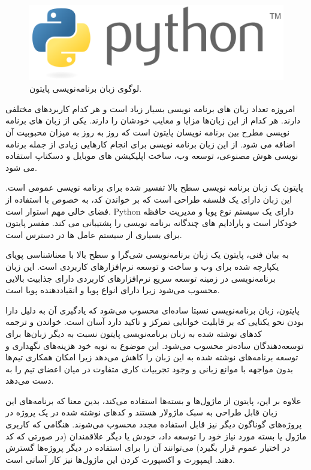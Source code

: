\begin{figure}[!h]
	\centering
	\includegraphics[width=0.7\linewidth]{Assets/python.png}
	\caption{لوگوی زبان برنامه‌نویسی پایتون.}
	\label{fig:pythonlogo}
\end{figure}

امروزه تعداد زبان های برنامه نویسی بسیار زیاد است و هر کدام کاربردهای مختلفی دارند. هر کدام از این زبان‌ها مزایا و معایب خودشان را دارند. یکی از زبان‌ های برنامه نویسی مطرح بین برنامه نویسان پایتون است که روز به روز به میزان محبوبیت آن اضافه می شود. از این زبان برنامه نویسی برای انجام کارهایی زیادی از جمله برنامه نویسی هوش مصنوعی، توسعه وب، ساخت اپلیکیشن های موبایل و دسکتاپ استفاده می شود.

پایتون یک زبان برنامه نویسی سطح بالا تفسیر شده برای برنامه نویسی عمومی است. این زبان دارای یک فلسفه طراحی است که بر خواندن کد، به خصوص با استفاده از فضای خالی مهم استوار است. Python دارای یک سیستم نوع پویا و مدیریت حافظه خودکار است و پارادایم های چندگانه برنامه نویسی را پشتیبانی می کند. مفسر پایتون برای بسیاری از سیستم عامل ها در دسترس است.

به بیان فنی، پایتون یک زبان برنامه‌نویسی شی‌گرا و سطح بالا  با معناشناسی پویای یکپارچه شده برای وب و ساخت و توسعه نرم‌افزارهای کاربردی است. این زبان برنامه‌نویسی در زمینه توسعه سریع نرم‌افزارهای کاربردی دارای جذابیت بالایی محسوب می‌شود زیرا دارای انواع پویا و انقیاددهنده پویا است.

پایتون، زبان برنامه‌نویسی نسبتا ساده‌ای محسوب می‌شود که یادگیری آن به دلیل دارا بودن نحو یکتایی که بر قابلیت خوانایی تمرکز و تاکید دارد آسان است. خواندن و ترجمه کدهای نوشته شده به زبان برنامه‌نویسی پایتون نسبت به دیگر زبان‌ها برای توسعه‌دهندگان ساده‌تر محسوب می‌شود. این موضوع به نوبه خود هزینه‌های نگهداری و توسعه برنامه‌های نوشته شده به این زبان را کاهش می‌دهد زیرا امکان همکاری تیم‌ها بدون مواجهه با موانع زبانی و وجود تجربیات کاری متفاوت در میان اعضای تیم را به دست می‌دهد.

علاوه بر این، پایتون از ماژول‌ها و بسته‌ها استفاده می‌کند، بدین معنا که برنامه‌های این زبان قابل طراحی به سبک ماژولار هستند و کدهای نوشته شده در یک پروژه در پروژه‌های گوناگون دیگر نیز قابل استفاده مجدد محسوب می‌شوند. هنگامی که کاربری ماژول یا بسته مورد نیاز خود را توسعه داد، خودش یا دیگر علاقمندان (در صورتی که کد در اختیار عموم قرار بگیرد) می‌توانند آن را برای استفاده در دیگر پروژه‌ها گسترش دهند. ایمپورت و اکسپورت کردن این ماژول‌ها نیز کار آسانی است.

